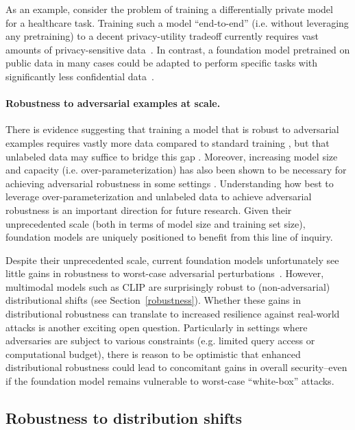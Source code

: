 As an example, consider the problem of training a differentially private model~\citep{dwork2006calibrating} for a healthcare task. Training such a model ``end-to-end'' (i.e. without leveraging any pretraining) to a decent privacy-utility tradeoff currently requires vast amounts of privacy-sensitive data~\citep{mcmahan2017learning, basu2021benchmarking}. In contrast, a foundation model pretrained on public data in many cases could be adapted to perform specific tasks with significantly less confidential data~\citep{bommasani19towards, tramer2021dp,li2022large,yu2022differentially}.

\paragraph{Robustness to adversarial examples at scale.} There is evidence suggesting that training a model that is robust to adversarial examples requires vastly more data compared to standard training \citep{schmidt2018adversarially}, but that unlabeled data may suffice to bridge this gap \citep{carmon2019unlabeled,uesato2019are}. Moreover, increasing model size and capacity (i.e. over-parameterization) has also been shown to be necessary for achieving adversarial robustness in some settings \citep{madry2018towards,bubeck2021universal}. Understanding how best to leverage over-parameterization and unlabeled data to achieve adversarial robustness is an important direction for future research. Given their unprecedented scale (both in terms of model size and training set size), foundation models are uniquely positioned to benefit from this line of inquiry.

Despite their unprecedented scale, current foundation models unfortunately see little gains in robustness to worst-case adversarial perturbations~\citep{Fort2021CLIPadversarial, wallace2019universal}. However, multimodal models such as CLIP are surprisingly robust to (non-adversarial) distributional shifts (see Section~\ref{robustness}).
Whether these gains in distributional robustness can translate to increased resilience against real-world attacks is another exciting open question. Particularly in settings where adversaries are subject to various constraints (e.g. limited query access or computational budget), there is reason to be optimistic that enhanced distributional robustness could lead to concomitant gains in overall security--even if the foundation model remains vulnerable to worst-case ``white-box'' attacks. 

\newsection
\subsection{Robustness to distribution shifts} 
\label{sec:robustness}

